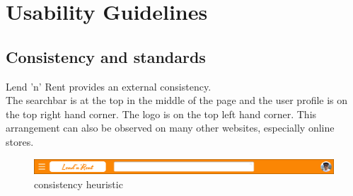 \section{Usability Guidelines}\label{Usability Guidelines}


\subsection{Consistency and standards}\label{consistency}
Lend 'n' Rent provides an external consistency. \\
The searchbar is at the top in the middle of the page and the user profile is on the top right hand corner. The logo is on the top left hand corner. This arrangement can also be observed on many other websites, especially online stores. 

	\begin{figure}[H]
		\centering
		\includegraphics[width=\linewidth]{abb/1_usability_guidelines/heuristic_constiency.png}
		\caption{consistency heuristic}
		\label{fig:heuristic_constiency}
	\end{figure}

